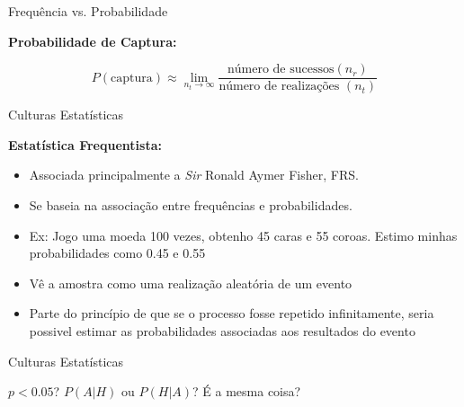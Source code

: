 \documentclass{beamer}\usepackage[]{graphicx}\usepackage[]{color}
\begin{document}
\begin{frame}{Frequência vs. Probabilidade}

\begin{centering}

\textbf{Probabilidade de Captura:}

\begin{equation*}
    P(\text{captura}) \approx \lim_{n_t \to \infty} \frac{\text{número de sucessos} (n_r)}{\text{número de realizações } (n_t)}
\end{equation*}

\end{centering}

\end{frame} 

\begin{frame}{Culturas Estatísticas}

\textbf{Estatística Frequentista:}

\begin{itemize}

  \item Associada principalmente a \emph{Sir} Ronald Aymer Fisher, FRS.
\vfill
  \item Se baseia na associação entre frequências e probabilidades.
\vfill
  \item Ex: Jogo uma moeda 100 vezes, obtenho 45 caras e 55 coroas. Estimo minhas probabilidades como 0.45 e 0.55
\vfill
  \item Vê a amostra como uma realização aleatória de um evento
\vfill
  \item Parte do princípio de que se o processo fosse repetido infinitamente, seria possivel estimar as probabilidades associadas aos resultados do evento
  
\end{itemize}
 
\end{frame}


\begin{frame}{Culturas Estatísticas}

\begin{centering}

  $p < 0.05$? \pause
\vfill
  $P(A|H)$ ou $P(H|A)$? \pause
\vfill
  É a mesma coisa?

\end{centering}
 
\end{frame}
\end{document}
